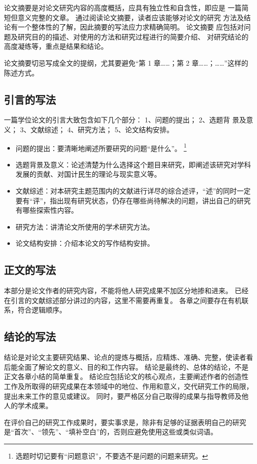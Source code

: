 		论文摘要是对论文研究内容的高度概括，应具有独立性和自含性，即应是 一篇简短但意义完整的文章。
		通过阅读论文摘要，读者应该能够对论文的研究 方法及结论有一个整体性的了解，因此摘要的写法应力求精确简明。
		论文摘要 应包括对问题及研究目的的描述、对使用的方法和研究过程进行的简要介绍、 对研究结论的高度凝练等，重点是结果和结论。
		
		论文摘要切忌写成全文的提纲，尤其要避免“第 1 章……；第 2 章……；……”这样的陈述方式。
		
		
		
		\subsection{引言的写法}
		
		一篇学位论文的引言大致包含如下几个部分：
		1、问题的提出；
		2、选题背 景及意义；
		3、文献综述；
		4、研究方法；
		5、论文结构安排。
		\begin{itemize}
			\item 问题的提出：要清晰地阐述所要研究的问题“是什么”。
			\footnote{选题时切记要有“问题意识”，不要选不是问题的问题来研究。}
			\item 选题背景及意义：论述清楚为什么选择这个题目来研究，即阐述该研究对学科发展的贡献、对国计民生的理论与现实意义等。
			\item 文献综述：对本研究主题范围内的文献进行详尽的综合述评，“述”的同时一定要有“评”，指出现有研究状态，仍存在哪些尚待解决的问题，讲出自己的研究有哪些探索性内容。
			\item 研究方法：讲清论文所使用的学术研究方法。
			\item 论文结构安排：介绍本论文的写作结构安排。
		\end{itemize}
		
		
		
		\subsection{正文的写法}
		
		本部分是论文作者的研究内容，不能将他人研究成果不加区分地掺和进来。
		已经在引言的文献综述部分讲过的内容，这里不需要再重复。
		各章之间要存在有机联系，符合逻辑顺序。
		
		
		
		\subsection{结论的写法}
		
		结论是对论文主要研究结果、论点的提炼与概括，应精炼、准确、完整，使读者看后能全面了解论文的意义、目的和工作内容。
		结论是最终的、总体的结论，不是正文各章小结的简单重复。
		结论应包括论文的核心观点，主要阐述作者的创造性工作及所取得的研究成果在本领域中的地位、作用和意义，交代研究工作的局限，提出未来工作的意见或建议。
		同时，要严格区分自己取得的成果与指导教师及他人的学术成果。
		
		在评价自己的研究工作成果时，要实事求是，除非有足够的证据表明自己的研究是“首次”、“领先”、“填补空白”的，否则应避免使用这些或类似词语。
